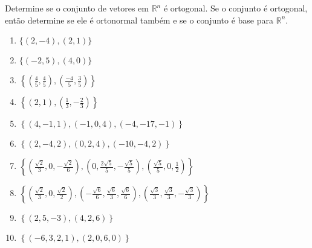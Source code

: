 \begin{question}
  Determine se o conjunto de vetores em $\mathbb{R}^{n}$ é ortogonal. Se o conjunto é ortogonal, então determine se ele é ortonormal também e se o conjunto é base para $\mathbb{R}^{n}$.
  \begin{enumerate}[label=\alph*)]
    \item $\{(2, -4), (2, 1)\}$
    \item $\{(-2, 5), (4, 0)\}$
    \item $\left\{\left(\frac{4}{5}, \frac{4}{5}\right), \left(\frac{-4}{5}, \frac{3}{5}\right)\right\}$
    \item $\left\{(2, 1), \left(\frac{1}{3}, -\frac{2}{3}\right)\right\}$
    \item $\left\{(4, -1, 1), (-1, 0, 4), (-4, -17, -1)\right\}$
    \item $\left\{(2, -4, 2), (0, 2, 4), (-10, -4, 2)\right\}$
    \item $\left\{\left(\frac{\sqrt{2}}{3}, 0, -\frac{\sqrt{2}}{6}\right), \left(0, \frac{2\sqrt{5}}{5}, -\frac{\sqrt{5}}{5}\right), \left(\frac{\sqrt{5}}{5}, 0, \frac{1}{2}\right)\right\}$
    \item $\left\{\left(\frac{\sqrt{2}}{3}, 0, \frac{\sqrt{2}}{2}\right), \left(-\frac{\sqrt{6}}{6}, \frac{\sqrt{6}}{3}, \frac{\sqrt{6}}{6}\right), \left(\frac{\sqrt{3}}{3}, \frac{\sqrt{3}}{3}, -\frac{\sqrt{3}}{3}\right)\right\}$
    \item $\left\{(2, 5, -3), (4, 2, 6)\right\}$
    \item $\left\{(-6, 3, 2, 1), (2, 0, 6, 0)\right\}$
  \end{enumerate}
\end{question}

